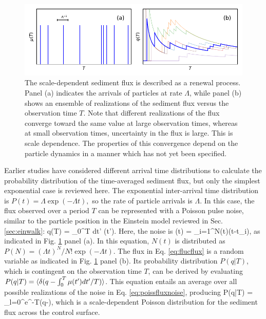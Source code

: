  \begin{figure}[!htbp]
	\includegraphics[width=\linewidth,keepaspectratio]{./figures/ch1/anceyRenewal.pdf}
	\caption{The scale-dependent sediment flux is described as a renewal process. Panel (a) indicates the arrivals of particles at rate $\Lambda$, while panel (b) shows an ensemble of realizations of the sediment flux versus the observation time $T$. Note that different realizations of the flux converge toward the same value at large observation times, whereas at small observation times, uncertainty in the flux is large. This is scale dependence. The properties of this convergence depend on the particle dynamics in a manner which has not yet been specified. }
	\label{fig:ancey}
\end{figure}
Earlier studies have considered different arrival time distributions to calculate the probability distribution of the time-averaged sediment flux, but only the simplest exponential case is reviewed here. The exponential inter-arrival time distribution is $P(t) = \Lambda \exp(-\Lambda t),$ so the rate of particle arrivals is $\Lambda$.
In this case, the flux observed over a period $T$ can be represented with a Poisson pulse noise, similar to the particle position in the Einstein model reviewed in Sec. \ref{sec:einwalk}:
\be q(T) = \int_0^T dt' \mu(t'). \label{eq:flucflux}\ee
Here, the noise is 
\be \mu(t) = \sum_{i=1}^{N(t)}\delta(t-t_i), \label{eq:poissfluxnoise}\ee
as indicated in Fig. \ref{fig:ancey} panel (a). 
In this equation, $N(t)$ is distributed as $P(N)=(\Lambda t)^N/N! \exp(-\Lambda t).$
The flux in Eq. \ref{eq:flucflux} is a random variable as indicated in Fig. \ref{fig:ancey} panel (b). Its probability distribution $P(q|T)$, which is contingent on the observation time $T$, can be derived by evaluating $P(q|T) = \langle \delta(q-\int_0^T \mu(t') dt'/T) \rangle$.
This equation entails an average over all possible realizations of the noise in Eq. \ref{eq:poissfluxnoise}, producing \citep{VanKampen2007}
\be P(q|T) = \sum_{l=0}^\infty {}e^{-\Lambda T}\delta(q-),\ee
which is a scale-dependent Poisson distribution for the sediment flux across the control surface.

